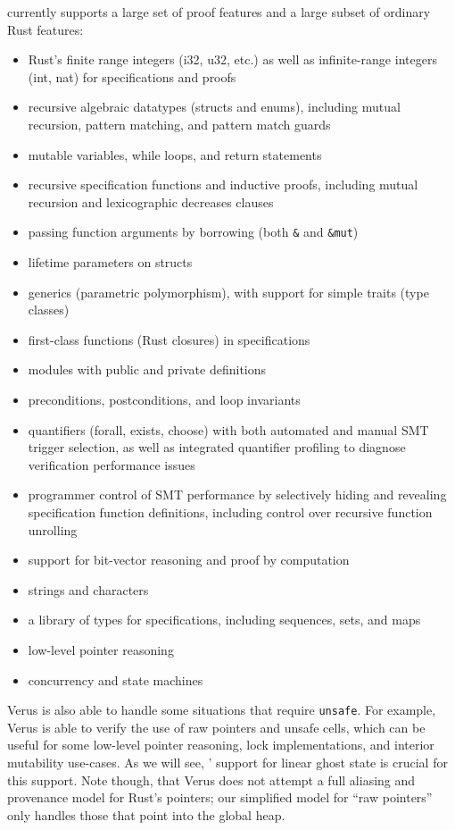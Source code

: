 \verus currently supports a large set of proof features
and a large subset of ordinary Rust features:
\begin{itemize}
\item Rust's finite range integers (i32, u32, etc.) as well as
  infinite-range integers (int, nat) for specifications and proofs
\item recursive algebraic datatypes (structs and enums),
  including mutual recursion, pattern matching, and pattern match guards
\item mutable variables, while loops, and return statements
\item recursive specification functions and inductive proofs,
  including mutual recursion and lexicographic decreases clauses
\item passing function arguments by borrowing (both \verb`&` and \verb`&mut`)
\item lifetime parameters on structs
\item generics (parametric polymorphism), with support for simple traits (type classes)
\item first-class functions (Rust closures) in specifications
\item modules with public and private definitions
\item preconditions, postconditions, and loop invariants
\item quantifiers (forall, exists, choose) with both automated and manual SMT trigger selection,
  as well as integrated quantifier profiling to diagnose verification performance issues
\item programmer control of SMT performance by selectively hiding and revealing
  specification function definitions,
  including control over recursive function unrolling
\item support for bit-vector reasoning and proof by computation
\item strings and characters
\item a library of types for specifications, including sequences, sets, and maps
\item low-level pointer reasoning
\item concurrency and state machines
\end{itemize}

Verus is also able to handle some situations that require \texttt{unsafe}.
For example, Verus is able to verify the use of raw pointers and unsafe cells, which can be useful
for some low-level pointer reasoning, lock implementations, and interior mutability use-cases.
As we will see, \verus' support for linear ghost state is crucial for this support.
Note though, that Verus does not attempt a full aliasing and provenance model for Rust's pointers;
our simplified model for ``raw pointers'' only handles those that point into the global heap.



